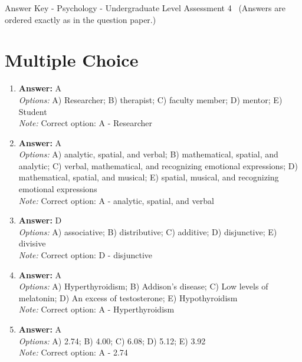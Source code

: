\documentclass[12pt]{article}
\begin{document}
\begin{center}
Answer Key - Psychology - Undergraduate Level Assessment 4 \
\small (Answers are ordered exactly as in the question paper.)
\end{center}

\section*{Multiple Choice}
\begin{enumerate}[label=\arabic*.]
\item \textbf{Answer:} A
\\ \textit{Options:} A) Researcher; B) therapist; C) faculty member; D) mentor; E) Student
\\ \textit{Note:} Correct option: A - Researcher
\item \textbf{Answer:} A
\\ \textit{Options:} A) analytic, spatial, and verbal; B) mathematical, spatial, and analytic; C) verbal, mathematical, and recognizing emotional expressions; D) mathematical, spatial, and musical; E) spatial, musical, and recognizing emotional expressions
\\ \textit{Note:} Correct option: A - analytic, spatial, and verbal
\item \textbf{Answer:} D
\\ \textit{Options:} A) associative; B) distributive; C) additive; D) disjunctive; E) divisive
\\ \textit{Note:} Correct option: D - disjunctive
\item \textbf{Answer:} A
\\ \textit{Options:} A) Hyperthyroidism; B) Addison's disease; C) Low levels of melatonin; D) An excess of testosterone; E) Hypothyroidism
\\ \textit{Note:} Correct option: A - Hyperthyroidism
\item \textbf{Answer:} A
\\ \textit{Options:} A) 2.74; B) 4.00; C) 6.08; D) 5.12; E) 3.92
\\ \textit{Note:} Correct option: A - 2.74
\end{enumerate}
\end{document}
